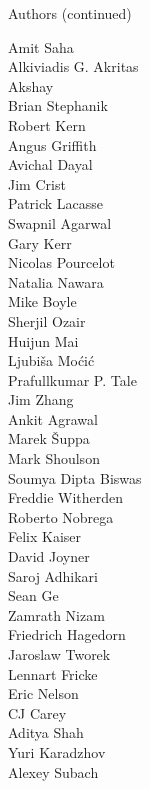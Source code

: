 \documentclass[xcolor=svgnames]{beamer}
\begin{document}
\begin{frame}{Authors (continued)}
  \begin{multicols}{5}
    \tiny

        Amit Saha\\
        Alkiviadis G. Akritas\\
        Akshay\\
        Brian Stephanik\\
        Robert Kern\\
        Angus Griffith\\
        Avichal Dayal\\
        Jim Crist\\
        Patrick Lacasse\\
        Swapnil Agarwal\\
        Gary Kerr\\
        Nicolas Pourcelot\\
        Natalia Nawara\\
        Mike Boyle\\
        Sherjil Ozair\\
        Huijun Mai\\
        Ljubiša Moćić\\
        Prafullkumar P. Tale\\
        Jim Zhang\\
        Ankit Agrawal\\
        Marek Šuppa\\
        Mark Shoulson\\
        Soumya Dipta Biswas\\
        Freddie Witherden\\
        Roberto Nobrega\\
        Felix Kaiser\\
        David Joyner\\
        Saroj Adhikari\\
        Sean Ge\\
        Zamrath Nizam\\
        Friedrich Hagedorn\\
        Jaroslaw Tworek\\
        Lennart Fricke\\
        Eric Nelson\\
        CJ Carey\\
        Aditya Shah\\
        Yuri Karadzhov\\
        Alexey Subach\\

\end{multicols}
\end{frame}
\end{document}
